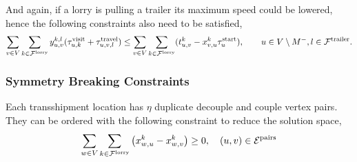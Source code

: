 And again, if a lorry is pulling a trailer its maximum speed could be lowered, hence the following constraints also need to be satisfied,
\begin{align}
  \label{eq:time-hard-last}
  \sum_{v \in V} \sum_{k \in \mathcal F^{\rm lorry}} y^{k,l}_{u,v} (\tau_{u,k}^{\rm visit} + \tau_{u,v,l}^{\rm travel}) \leq \sum_{v \in V} \sum_{k \in \mathcal F^{\rm lorry}} (t_{u,v}^k - x^k_{v,u} \tau_u^{\rm start}),
  \qquad u\in V \setminus M^- , l \in \mathcal F^{\rm trailer}.
\end{align}


%










\subsubsection{Symmetry Breaking Constraints}
\label{sec:symmetry}

Each transshipment location has $\eta$ duplicate decouple and couple vertex pairs. They can be ordered with the following constraint to reduce the solution space,
\begin{align}
  \sum_{w \in V}
  \sum_{k \in \mathcal{F}^{\rm lorry} }
  \left( x^{k}_{w,u} - x^{k}_{w,v} \right) \geq 0,
  \quad (u,v) \in \mathcal E^{\rm pairs}
\end{align}

